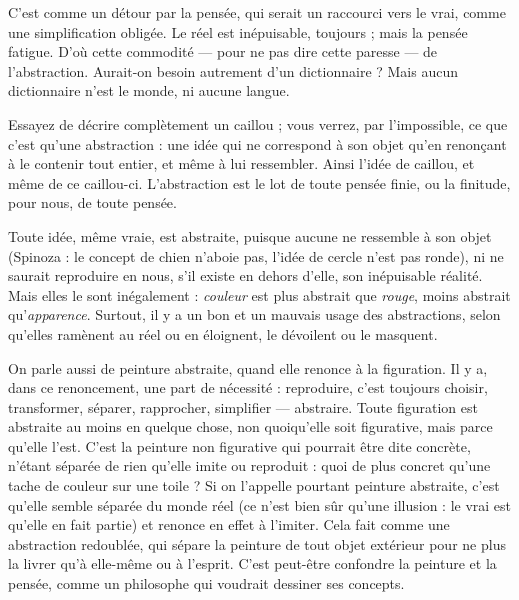 C’est comme un détour par la pensée, qui serait un raccourci vers le vrai,
comme une simplification obligée. Le réel est inépuisable, toujours ; mais la
pensée fatigue. D’où cette commodité — pour ne pas dire cette paresse — de
l’abstraction. Aurait-on besoin autrement d’un dictionnaire ? Mais aucun dictionnaire
n’est le monde, ni aucune langue.

Essayez de décrire complètement un caillou ; vous verrez, par l'impossible,
ce que c’est qu’une abstraction : une idée qui ne correspond à son objet qu’en
renonçant à le contenir tout entier, et même à lui ressembler. Ainsi l’idée de
caillou, et même de ce caillou-ci. L’abstraction est le lot de toute pensée finie,
ou la finitude, pour nous, de toute pensée.

Toute idée, même vraie, est abstraite, puisque aucune ne ressemble à son
objet (Spinoza : le concept de chien n’aboie pas, l’idée de cercle n'est pas
ronde), ni ne saurait reproduire en nous, s’il existe en dehors d’elle, son inépuisable 
réalité. Mais elles le sont inégalement : {\it couleur} est plus abstrait que {\it rouge},
moins abstrait qu’{\it apparence}. Surtout, il y a un bon et un mauvais usage des abstractions,
selon qu’elles ramènent au réel ou en éloignent, le dévoilent ou le
masquent.

On parle aussi de peinture abstraite, quand elle renonce à la figuration. Il y
a, dans ce renoncement, une part de nécessité : reproduire, c’est toujours
choisir, transformer, séparer, rapprocher, simplifier — abstraire. Toute figuration
est abstraite au moins en quelque chose, non quoiqu’elle soit figurative,
mais parce qu’elle l'est. C’est la peinture non figurative qui pourrait être dite
concrète, n'étant séparée de rien qu’elle imite ou reproduit : quoi de plus
concret qu'une tache de couleur sur une toile ? Si on l'appelle pourtant peinture
abstraite, c’est qu’elle semble séparée du monde réel (ce n’est bien sûr
qu'une illusion : le vrai est qu’elle en fait partie) et renonce en effet à l’imiter.
Cela fait comme une abstraction redoublée, qui sépare la peinture de tout objet
extérieur pour ne plus la livrer qu’à elle-même ou à l'esprit. C’est peut-être
confondre la peinture et la pensée, comme un philosophe qui voudrait dessiner
ses concepts.


